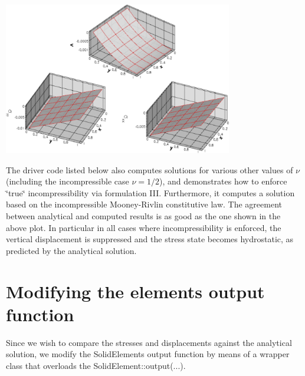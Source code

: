  
\begin{DoxyImage}
\includegraphics[width=0.75\textwidth]{validate_vs_lin}
\end{DoxyImage}


The driver code listed below also computes solutions for various other values of $ \nu $ (including the incompressible case $ \nu=1/2 $), and demonstrates how to enforce \char`\"{}true\char`\"{} incompressibility via formulation I\+II. Furthermore, it computes a solution based on the incompressible Mooney-\/\+Rivlin constitutive law. The agreement between analytical and computed results is as good as the one shown in the above plot. In particular in all cases where incompressibility is enforced, the vertical displacement is suppressed and the stress state becomes hydrostatic, as predicted by the analytical solution.



 

\hypertarget{index_wrapper}{}\section{Modifying the element\textquotesingle{}s output function}\label{index_wrapper}
Since we wish to compare the stresses and displacements against the analytical solution, we modify the {\ttfamily Solid\+Element\textquotesingle{}s} output function by means of a wrapper class that overloads the {\ttfamily Solid\+Element\+::output}(...).


